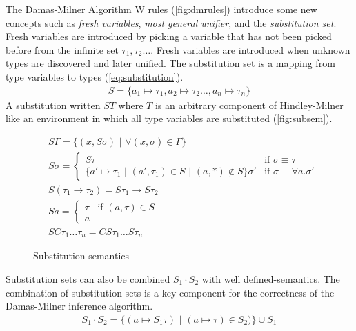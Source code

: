 \documentclass[11pt,oneside,a4paper]{report}
\begin{document}
The Damas-Milner Algorithm W rules (\autoref{fig:dmrules}) introduce some new concepts such as \textit{fresh variables}, \textit{most general unifier}, and the \textit{substitution set}.
Fresh variables are introduced by picking a variable that has not been picked before from the infinite set $\tau_1, \tau_2 \dots $.
Fresh variables are introduced when unknown types are discovered and later unified.
The substitution set is a mapping from type variables to types (\autoref{eq:substitution}).
\begin{align}
    S = \{ a_1 \mapsto \tau_1, a_2 \mapsto \tau_2 \dots , a_n \mapsto \tau_n \} 
    \label{eq:substitution}
\end{align}
A substitution written $S T$ where $T$ is an arbitrary component of Hindley-Milner like an environment in which all type variables are substituted (\autoref{fig:subsem}).
\begin{figure}
\begin{mdframed}
\begin{align}
    &S \Gamma = \{ (x, S \sigma) \,\,|\,\, \forall (x, \sigma) \in \Gamma \} \tag{Environment}\\
    &S \sigma  = 
        \begin{cases}
            S \tau & \text{if } \sigma \equiv \tau\\
            \{ a' \mapsto \tau_1 \,\,|\,\, (a', \tau_1) \in S \,\,|\,\, (a, *) \notin S \} \sigma' & \text{if } \sigma \equiv \forall a . \sigma'
        \end{cases}
    \tag{Poly}\\
    &S (\tau_1 \rightarrow \tau_2) = S\tau_1 \rightarrow S\tau_2 \tag{Arrow}\\
    &S a = 
        \begin{cases}
            \tau & \text{if } (a, \tau) \in S\\
            a & 
        \end{cases}
    \tag{Typevariable}\\
    &S C \tau_1 \dots \tau_n = C S\tau_1 \dots S\tau_n \tag{Constructor}
\end{align}
\end{mdframed}
    \caption{Substitution semantics}
    \label{fig:subsem}
\end{figure}
Substitution sets can also be combined $S_1 \cdot S_2$ with well defined-semantics.
The combination of substitution sets is a key component for the correctness of the Damas-Milner inference algorithm.
\begin{align}
    S_1 \cdot S_2 = \{ (a \mapsto S_1\tau) \,\,|\,\, (a \mapsto \tau) \in S_2) \} \cup S_1
    \label{eq:combination}
\end{align}
\end{document}
